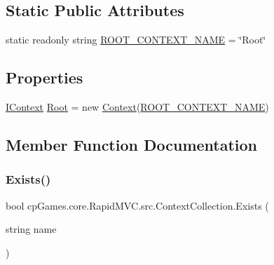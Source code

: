 \subsection*{Static Public Attributes}
\begin{DoxyCompactItemize}
\item 
static readonly string \mbox{\hyperlink{classcp_games_1_1core_1_1_rapid_m_v_c_1_1src_1_1_context_collection_a0f80312ff7ecedc098b2ee8e2c18d588}{R\+O\+O\+T\+\_\+\+C\+O\+N\+T\+E\+X\+T\+\_\+\+N\+A\+ME}} = \char`\"{}Root\char`\"{}
\end{DoxyCompactItemize}
\subsection*{Properties}
\begin{DoxyCompactItemize}
\item 
\mbox{\hyperlink{interfacecp_games_1_1core_1_1_rapid_m_v_c_1_1_i_context}{I\+Context}} \mbox{\hyperlink{classcp_games_1_1core_1_1_rapid_m_v_c_1_1src_1_1_context_collection_a5cee2cbf3726c48e4195a1fd9d4616be}{Root}} = new \mbox{\hyperlink{classcp_games_1_1core_1_1_rapid_m_v_c_1_1src_1_1_context}{Context}}(\mbox{\hyperlink{classcp_games_1_1core_1_1_rapid_m_v_c_1_1src_1_1_context_collection_a0f80312ff7ecedc098b2ee8e2c18d588}{R\+O\+O\+T\+\_\+\+C\+O\+N\+T\+E\+X\+T\+\_\+\+N\+A\+ME}})
\end{DoxyCompactItemize}


\subsection{Member Function Documentation}
\mbox{\label{classcp_games_1_1core_1_1_rapid_m_v_c_1_1src_1_1_context_collection_a298bbb09a2a4be911a460c436b1a913a}} 
\subsubsection{\texorpdfstring{Exists()}{Exists()}}
{\footnotesize\ttfamily bool cp\+Games.\+core.\+Rapid\+M\+V\+C.\+src.\+Context\+Collection.\+Exists (\begin{DoxyParamCaption}\item[{string}]{name }\end{DoxyParamCaption})}



